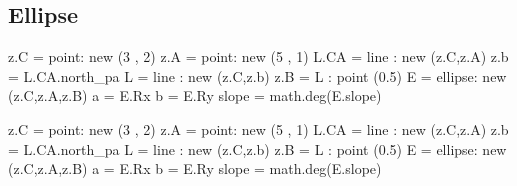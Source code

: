 \subsection{Ellipse} %
\label{sub:ellipse}
\begin{minipage}{.5\textwidth}
\begin{tkzexample}[latex=0cm,small,code only]
\begin{tkzelements}
   z.C       = point: new (3 , 2)
   z.A       = point: new (5 , 1)
   L.CA      = line : new (z.C,z.A)
   z.b       = L.CA.north_pa
   L         = line : new (z.C,z.b)
   z.B       = L : point (0.5)
   E         = ellipse: new (z.C,z.A,z.B)
   a         = E.Rx
   b         = E.Ry
   slope     = math.deg(E.slope)
\end{tkzelements}
\end{tkzexample}
\end{minipage}
\begin{minipage}{.5\textwidth}
\begin{tkzelements}
z.C  = point: new (3 , 2)
z.A  = point: new (5 , 1)
L.CA = line : new (z.C,z.A)
z.b  = L.CA.north_pa
L    = line : new (z.C,z.b)
z.B  = L : point (0.5)
E    = ellipse: new (z.C,z.A,z.B)
a    = E.Rx
b    = E.Ry
slope    = math.deg(E.slope)
\end{tkzelements}

\hspace*{\fill}
\hspace*{\fill}
\end{minipage}

